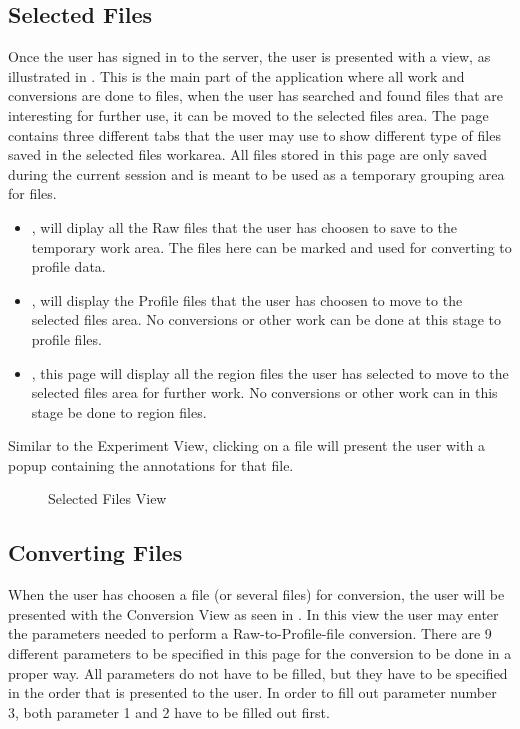 \subsection{Selected Files}\label{sec:and_manual_selected}
Once the user has signed in to the server, the user is presented with a  view, as illustrated in .
This is the main part of the application where all work and conversions are done to files, when the user has searched and found files that are interesting for further use, it can be moved to the selected files area. 
The page contains three different tabs that the user may use to show different type of files saved in the selected files workarea. All files stored in this page are only saved during the current session and is meant to be used as a temporary grouping area for files. 

\begin{itemize}

	\item {}, will diplay all the Raw files that the user has choosen to save to the temporary work area. The files here can be marked and used for converting to profile data.
    \item {}, will display the Profile files that the user has choosen to move to the selected files area. No conversions or other work can be done at this stage to profile files.
    \item {}, this page will display all the region files the user has selected to move to the selected files area for further work. No conversions or other work can in this stage be done to region files.
    
\end{itemize}

Similar to the Experiment View, clicking on a file will present the user with a popup containing the annotations for that file.


\begin{figure}[h]
\caption{Selected Files View}
\label{fig:and_selected_man}
\end{figure}
\FloatBarrier


\subsection{Converting Files}
When the user has choosen a file (or several files) for conversion, the user will be presented with the Conversion View as seen in . In this view the user may enter the parameters needed to perform a Raw-to-Profile-file conversion.
\newline
There are 9 different parameters to be specified in this page for the conversion to be done in a proper way. All parameters do not have to be filled, but they have to be specified in the order that is presented to the user. In order to fill out parameter number 3, both parameter 1 and 2 have to be filled out first.

